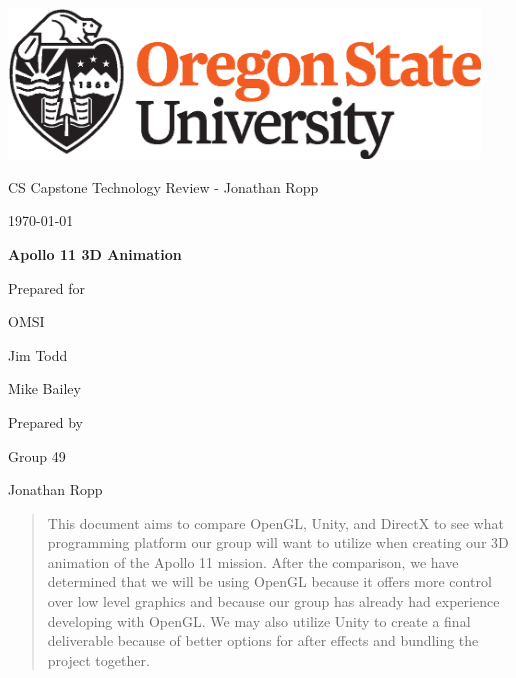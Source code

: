 \documentclass[onecolumn, draftclsnofoot,10pt, compsoc]{IEEEtran}
\def \CapstoneTeamName{		    The Apolloers}
\def \CapstoneTeamNumber{		49}
\def \GroupMemberOne{			Jonathan Ropp}
\def \GroupMemberTwo{			Shannon Sandy}
\def \GroupMemberThree{			Dean Akin}
\def \CapstoneProjectName{		Apollo 11 3D Animation}
\def \CapstoneSponsorCompany{	OMSI}
\def \CapstoneSponsorPersona{	Jim Todd}
\def \CapstoneSponsorPersonb{	Mike Bailey}
\newcommand{\NameSigPair}[1]{\par
\makebox[2.75in][r]{#1} \hfil 	\makebox[3.25in]{\makebox[2.25in]{\hrulefill} \hfill		\makebox[.75in]{\hrulefill}}
\par\vspace{-12pt} \textit{\tiny\noindent
\makebox[2.75in]{} \hfil		\makebox[3.25in]{\makebox[2.25in][r]{Signature} \hfill	\makebox[.75in][r]{Date}}}}
\renewcommand{\NameSigPair}[1]{#1}
\begin{document}
\begin{titlepage}
    \begin{singlespace}
        \hfill 
        \includegraphics[height=4cm]{OSU_horizontal_2C_O_over_B.eps}   
        \par\vspace{.2in}
        \centering
        \scshape{
            \huge CS Capstone Technology Review - Jonathan Ropp \par
            {\large\today}\par
            \vspace{.5in}
            \textbf{\Huge\CapstoneProjectName}\par
            \vfill
            {\large Prepared for}\par
            \Huge \CapstoneSponsorCompany\par
            \vspace{5pt}
            {\Large\NameSigPair{\CapstoneSponsorPersona}\par}
            {\Large\NameSigPair{\CapstoneSponsorPersonb}\par}
            {\large Prepared by }\par
            Group\CapstoneTeamNumber\par
            \vspace{5pt}
            {\Large
                \NameSigPair{\GroupMemberOne}\par
            }
            \vspace{20pt}
        }
        \begin{abstract}
        	This document aims to compare OpenGL, Unity, and DirectX to see what programming platform our group will want to utilize when creating our 3D animation of the Apollo 11 mission. After the comparison, we have determined that we will be using OpenGL because it offers more control over low level graphics and because our group has already had experience developing with OpenGL. We may also utilize Unity to create a final deliverable because of better options for after effects and bundling the project together. 
        \end{abstract}     
    \end{singlespace}
\end{titlepage}
\end{document}
